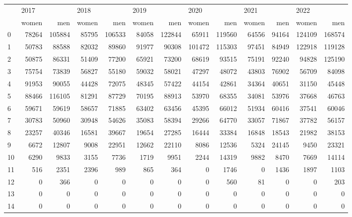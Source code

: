 \begin{tabular}{lrrrrrrrrrrrr}
\toprule
{} & \multicolumn{2}{l}{2017} & \multicolumn{2}{l}{2018} & \multicolumn{2}{l}{2019} & \multicolumn{2}{l}{2020} & \multicolumn{2}{l}{2021} & \multicolumn{2}{l}{2022} \\
{} &  women &     men &  women &     men &  women &     men &   women &     men &  women &    men &   women &     men \\
\midrule
0  &  78264 &  105884 &  85795 &  106533 &  84058 &  122844 &   65911 &  119560 &  64556 &  94164 &  124109 &  168574 \\
1  &  50783 &   88588 &  82032 &   89860 &  91977 &   90308 &  101472 &  115303 &  97451 &  84949 &  122918 &  119128 \\
2  &  50875 &   86331 &  51409 &   77200 &  65921 &   73200 &   68619 &   93515 &  75191 &  92240 &   94828 &  125190 \\
3  &  75754 &   73839 &  56827 &   55180 &  59032 &   58021 &   47297 &   48072 &  43803 &  76902 &   56709 &   84098 \\
4  &  91953 &   90055 &  44428 &   72075 &  48345 &   57422 &   44154 &   42861 &  34364 &  40651 &   31150 &   45448 \\
5  &  88466 &  116105 &  81291 &   87729 &  70195 &   88913 &   53970 &   68355 &  34081 &  53976 &   37668 &   46763 \\
6  &  59671 &   59619 &  58657 &   71885 &  63402 &   63456 &   45395 &   66012 &  51934 &  60416 &   37541 &   60046 \\
7  &  30783 &   50960 &  30948 &   54626 &  35083 &   58394 &   29266 &   64770 &  33057 &  71867 &   37782 &   56157 \\
8  &  23257 &   40346 &  16581 &   39667 &  19654 &   27285 &   16444 &   33384 &  16848 &  18543 &   21982 &   38153 \\
9  &   6672 &   12807 &   9008 &   22951 &  12662 &   22110 &    8086 &   12536 &   5324 &  24145 &    9450 &   23321 \\
10 &   6290 &    9833 &   3155 &    7736 &   1719 &    9951 &    2244 &   14319 &   9882 &   8470 &    7669 &   14114 \\
11 &    516 &    2351 &   2396 &     989 &    865 &     364 &       0 &    1746 &      0 &   1436 &    1897 &    1103 \\
12 &      0 &     366 &      0 &       0 &      0 &       0 &       0 &     560 &     81 &      0 &       0 &     203 \\
13 &      0 &       0 &      0 &       0 &      0 &       0 &       0 &       0 &      0 &      0 &       0 &       0 \\
14 &      0 &       0 &      0 &       0 &      0 &       0 &       0 &       0 &      0 &      0 &       0 &       0 \\
\bottomrule
\end{tabular}
